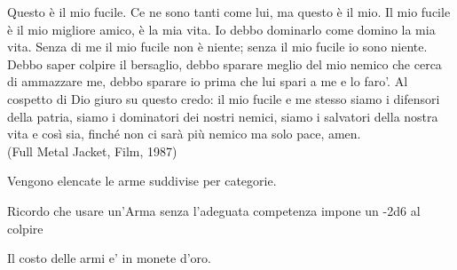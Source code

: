 \documentclass[a4paper,11pt,twoside,openany]{book}
\begin{document}
\label{equipaggiamento---armi}
\begin{tcolorbox}[enhanced,arc=5pt,boxrule=0.3pt]{
Questo è il mio fucile. Ce ne sono tanti come lui, ma questo è il mio. Il mio fucile è il mio migliore amico, è la mia vita. Io debbo dominarlo come domino la mia vita. Senza di me il mio fucile non è niente; senza il mio fucile io sono niente. Debbo saper colpire il bersaglio, debbo sparare meglio del mio nemico che cerca di ammazzare me, debbo sparare io prima che lui spari a me e lo faro'. Al cospetto di Dio giuro su questo credo: il mio fucile e me stesso siamo i difensori della patria, siamo i dominatori dei nostri nemici, siamo i salvatori della nostra vita e così sia, finché non ci sarà più nemico ma solo pace, amen.
\\
(Full Metal Jacket, Film, 1987)}\end{tcolorbox}\medskip

Vengono elencate le arme suddivise per categorie.

Ricordo che usare un'Arma senza l'adeguata competenza impone un -2d6 al colpire

Il costo delle armi e' in monete d'oro.

\bigskip
\end{document}

